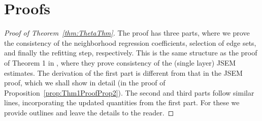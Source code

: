 \documentclass[12pt, letterpaper]{article}
\numberwithin{equation}{section}
\begin{document}
\appendix
\section{Proofs}
\begin{proof}[Proof of Theorem~\ref{thm:ThetaThm}]
The proof has three parts, where we prove the consistency of the neighborhood regression coefficients, selection of edge sets, and finally the refitting step, respectively. This is the same structure as the proof of Theorem 1 in \cite{MaMichailidis15}, where they prove consistency of the (single layer) JSEM estimates. The derivation of the first part is different from that in the JSEM proof, which we shall show in detail (in the proof of Proposition~\ref{prop:Thm1ProofProp2}). The second and third parts follow similar lines, incorporating the updated quantities from the first part. For these we provide outlines and leave the details to the reader.


\end{proof}
\end{document}
